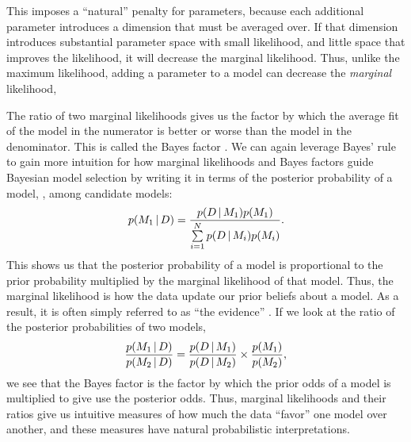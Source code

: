 This imposes a ``natural'' penalty for parameters, because each additional
parameter introduces a dimension that must be averaged over.
If that dimension introduces substantial parameter space with small likelihood,
and little space that improves the likelihood, it will decrease the marginal
likelihood.
Thus, unlike the maximum likelihood, adding a parameter to a model can
decrease the \emph{marginal} likelihood,

\begin{linenomath}
The ratio of two marginal likelihoods gives us the factor by which the
average fit of the model in the numerator is better or worse than the
model in the denominator.
This is called the Bayes factor \citep{Jeffreys1935}.
We can again leverage Bayes' rule to gain more intuition for how marginal
likelihoods and Bayes factors guide Bayesian model selection by
writing it in terms of the posterior probability of a model, \model[1],
among \nmodels candidate models:
\begin{equation}
    p(\model[1] \given \data) = \frac{
        p(\data \given \model[1])
        p(\model[1])
    }{
        \sum\limits_{i=1}^{\nmodels}
        p(\data \given \model[i])
        p(\model[i])
    }.
    \label{eq:bayesRuleModelProbability}
\end{equation}
This shows us that the posterior probability of a model is proportional to the
prior probability multiplied by the marginal likelihood of that model.
Thus, the marginal likelihood is how the data update our prior beliefs about a
model.
As a result, it is often simply referred to as ``the evidence''
\citep{MacKay2005}.
If we look at the ratio of the posterior probabilities of two models,
\begin{equation}
    \frac{
        p(\model[1] \given \data)
    }{
        p(\model[2] \given \data)
    }
    =
    \frac{
        p(\data \given \model[1])
    }{
        p(\data \given \model[2])
    }
    \times
    \frac{
        p(\model[1])
    }{
        p(\model[2])
    },
    \label{eq:modelOdds}
\end{equation}
we see that the Bayes factor is the factor by which the prior odds of a model
is multiplied to give use the posterior odds.
Thus, marginal likelihoods and their ratios give us intuitive measures of how
much the data ``favor'' one model over another, and these measures have natural
probabilistic interpretations.
\end{linenomath}

